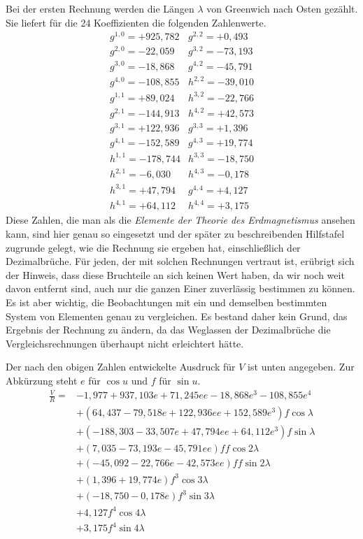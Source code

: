 Bei der ersten Rechnung werden die Längen $\lambda$ von Greenwich nach Osten gezählt. Sie liefert für die 24 Koeffizienten die folgenden Zahlenwerte.
\[
\begin{array}{r|r}
g^{1,0}=+925{,}782&g^{2,2}=+0{,}493\\
g^{2,0}=-22{,}059&g^{3,2}=-73{,}193\\
g^{3,0}=-18{,}868&g^{4,2}=-45{,}791\\
g^{4,0}=-108{,}855&h^{2,2}=-39{,}010\\
g^{1,1}=+89{,}024&h^{3,2}=-22{,}766\\
g^{2,1}=-144{,}913&h^{4,2}=+42{,}573\\
g^{3,1}=+122{,}936&g^{3,3}=+1{,}396\\
g^{4,1}=-152{,}589&g^{4,3}=+19{,}774\\
h^{1,1}=-178{,}744&h^{3,3}=-18{,}750\\
h^{2,1}=-6{,}030&h^{4,3}=-0{,}178\\
h^{3,1}=+47{,}794&g^{4,4}=+4{,}127\\
h^{4,1}=+64{,}112&h^{4,4}=+3{,}175
\end{array}
\]
Diese Zahlen, die man als die \textit{Elemente der Theorie des Erdmagnetismus} ansehen kann, sind hier genau so eingesetzt und der später zu beschreibenden Hilfstafel zugrunde gelegt, wie die Rechnung sie ergeben hat, einschließlich der Dezimalbrüche. Für jeden, der mit solchen Rechnungen vertraut ist, erübrigt sich der Hinweis, dass diese Bruchteile an sich keinen Wert haben, da wir noch weit davon entfernt sind, auch nur die ganzen Einer zuverlässig bestimmen zu können. Es ist aber wichtig, die Beobachtungen mit ein und demselben bestimmten System von Elementen genau zu vergleichen. Es bestand daher kein Grund, das Ergebnis der Rechnung zu ändern, da das Weglassen der Dezimalbrüche die Vergleichsrechnungen überhaupt nicht erleichtert hätte.

Der nach den obigen Zahlen entwickelte Ausdruck für $V$ ist unten angegeben. Zur Abkürzung steht $e$ für $\cos u$ und $f$ für $\sin u$.
\[
\begin{aligned}
\frac VR={}&-1{,}977+937{,}103e+71{,}245ee-18{,}868e^3-108{,}855e^4\\
&+(64{,}437-79{,}518e+122{,}936ee+152{,}589e^3)f\cos\lambda\\
&+(-188{,}303-33{,}507e+47{,}794ee+64{,}112e^3)f\sin\lambda\\
&+(7{,}035-73{,}193e-45{,}791ee)ff\cos2\lambda\\
&+(-45{,}092-22{,}766e-42{,}573ee)ff\sin2\lambda\\
&+(1{,}396+19{,}774e)f^3\cos3\lambda\\
&+(-18{,}750-0{,}178e)f^3\sin3\lambda\\
&+4{,}127f^4\cos4\lambda\\
&+3{,}175f^4\sin4\lambda
\end{aligned}
\]

